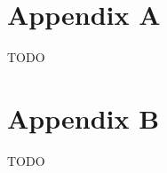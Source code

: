 \begin{appendices}
\section*{Appendix A}

TODO

\newpage
\section*{Appendix B}

TODO

\end{appendices}
